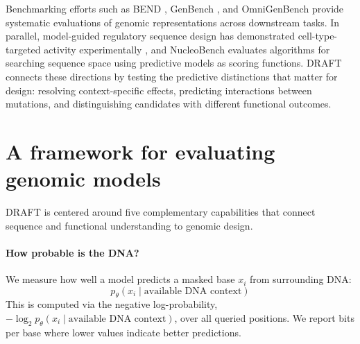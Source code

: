 Benchmarking efforts such as BEND \citep{marin2024bend}, GenBench \citep{liu2024genbench}, and OmniGenBench \citep{yang2025omnigenbench} provide systematic evaluations of genomic representations across downstream tasks. In parallel, model-guided regulatory sequence design has demonstrated cell-type-targeted activity experimentally \citep{gosai2024design,yin2025enhancer,castillohair2025atlas}, and NucleoBench \citep{shor2025nucleobench} evaluates algorithms for searching sequence space using predictive models as scoring functions. DRAFT connects these directions by testing the predictive distinctions that matter for design: resolving context-specific effects, predicting interactions between mutations, and distinguishing candidates with different functional outcomes. %













\FloatBarrier




\section{A framework for evaluating genomic models}
\label{sec:questions}

DRAFT is centered around five complementary capabilities that connect sequence and functional understanding to genomic design. %

\begingroup
\setlength{\abovedisplayskip}{5pt plus 1pt minus 2pt}
\setlength{\belowdisplayskip}{5pt plus 1pt minus 2pt}
\setlength{\abovedisplayshortskip}{0pt plus 1pt}
\setlength{\belowdisplayshortskip}{3pt plus 1pt minus 1pt}
\paragraph{ How probable is the DNA?}
We measure how well a model predicts a masked base $x_i$ from surrounding DNA:
\begin{equation}
    p_\theta\!\left(x_i \mid \text{available DNA context}\right)
    \label{eq:sequence-prior}
\end{equation}
This is computed via the negative log-probability, $-\log_2 p_\theta(x_i\mid\text{available DNA context})$, over all queried positions. We report bits per base where lower values indicate better predictions. 






